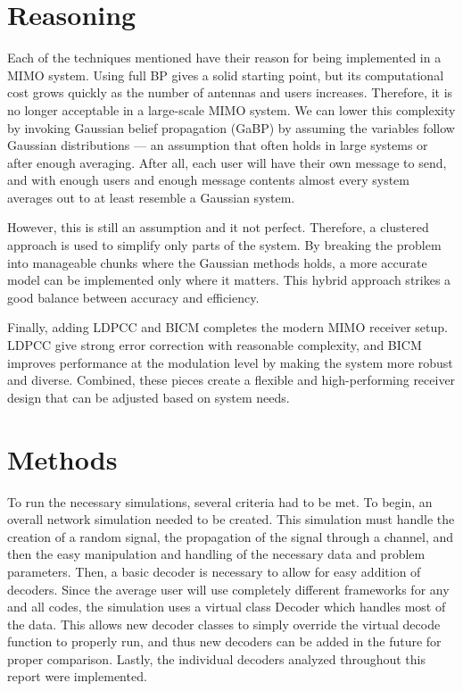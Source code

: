 \documentclass[conference]{IEEEtran}
\begin{document}
\section{Reasoning}
Each of the techniques mentioned have their reason for being implemented in a MIMO system. Using full BP gives a solid starting point, but its computational cost grows quickly as the number of antennas and users increases. Therefore, it is no longer acceptable in a large-scale MIMO system. We can lower this complexity by invoking Gaussian belief propagation (GaBP) by assuming the variables follow Gaussian distributions — an assumption that often holds in large systems or after enough averaging. After all, each user will have their own message to send, and with enough users and enough message contents almost every system averages out to at least resemble a Gaussian system.\par
However, this is still an assumption and it not perfect. Therefore, a clustered approach is used to simplify only parts of the system. By breaking the problem into manageable chunks where the Gaussian methods holds, a more accurate model can be implemented only where it matters. This hybrid approach strikes a good balance between accuracy and efficiency.

Finally, adding LDPCC and BICM completes the modern MIMO receiver setup. LDPCC give strong error correction with reasonable complexity, and BICM improves performance at the modulation level by making the system more robust and diverse. Combined, these pieces create a flexible and high-performing receiver design that can be adjusted based on system needs.

\section{Methods}
To run the necessary simulations, several criteria had to be met. To begin, an overall network simulation needed to be created. This simulation must handle the creation of a random signal, the propagation of the signal through a channel, and then the easy manipulation and handling of the necessary data and problem parameters. Then, a basic decoder is necessary to allow for easy addition of decoders. Since the average user will use completely different frameworks for any and all codes, the simulation uses a virtual class Decoder which handles most of the data. This allows new decoder classes to simply override the virtual decode function to properly run, and thus new decoders can be added in the future for proper comparison. Lastly, the individual decoders analyzed throughout this report were implemented.
\end{document}
